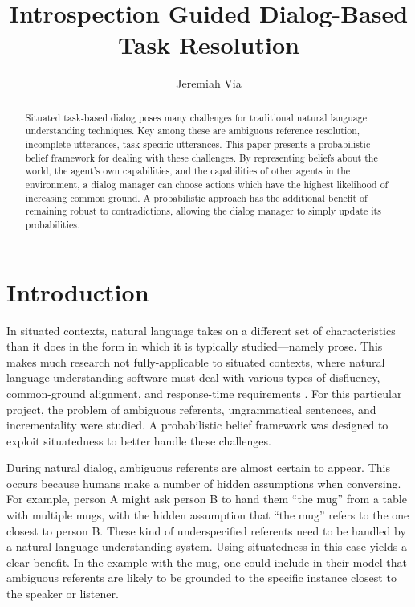 \documentclass[12pt]{article}
\title{Introspection Guided Dialog-Based Task Resolution}
\author{Jeremiah Via}
\begin{document}
\maketitle
\begin{abstract}
  Situated task-based dialog poses many challenges for traditional
  natural language understanding techniques. Key among these are
  ambiguous reference resolution, incomplete utterances, task-specific
  utterances. This paper presents a probabilistic belief framework for
  dealing with these challenges. By representing beliefs about the
  world, the agent's own capabilities, and the capabilities of other
  agents in the environment, a dialog manager can choose actions
  which have the highest likelihood of increasing common ground. A
  probabilistic approach has the additional benefit of remaining
  robust to contradictions, allowing the dialog manager to simply
  update its probabilities.
\end{abstract}

\section{Introduction}
\label{sec:intro}
In situated contexts, natural language takes on a different set of
characteristics than it does in the form in which it is typically
studied---namely prose. This makes much research not fully-applicable
to situated contexts, where natural language understanding software
must deal with various types of disfluency, common-ground alignment,
and response-time requirements \cite{Scheutz2011:dialogue}. For this
particular project, the problem of ambiguous referents, ungrammatical
sentences, and incrementality were studied. A probabilistic belief
framework was designed to exploit situatedness to better handle these
challenges.

During natural dialog, ambiguous referents are almost certain to
appear. This occurs because humans make a number of hidden assumptions
when conversing. For example, person A might ask person B to hand them
``the mug'' from a table with multiple mugs, with the hidden
assumption that ``the mug'' refers to the one closest to person
B. These kind of underspecified referents need to be handled by a
natural language understanding system. Using situatedness in this case
yields a clear benefit. In the example with the mug, one could include
in their model that ambiguous referents are likely to be grounded to
the specific instance closest to the speaker or listener.
\end{document}
